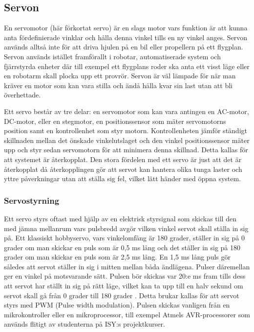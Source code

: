 \documentclass[a4paper,12pt]{article}
\begin{document}
\subsection{Servon}
En servomotor (här förkortat servo) är en slags motor vars funktion är att kunna anta fördefinierade  vinklar och hålla denna vinkel tills en ny vinkel anges. Servon används alltså inte för att driva hjulen på en bil eller propellern på ett flygplan. Servon används istället framförallt i robotar, automatiserade system  och fjärrstyrda enheter där till exempel ett flygplans roder ska anta ett visst läge eller en robotarm skall plocka upp ett provrör. Servon är väl lämpade för när man kräver en motor som kan vara stilla och ändå hålla kvar sin last utan att bli överhettade. 
 
Ett servo består av tre delar: en servomotor som kan vara antingen en AC-motor, DC-motor, eller en stegmotor, en positionssensor som mäter servomotorns position samt en kontrollenhet som styr motorn.  Kontrollenheten jämför ständigt skillnaden mellan det önskade vinkelutslaget och den vinkel positionssensor mäter upp och styr sedan servomotorn för att minimera denna skillnad. Detta kallas för att systemet är återkopplat. Den stora fördelen med ett servo är just att det är återkopplat då återkopplingen gör att servot kan hantera olika tunga laster och yttre påverkningar utan att ställa sig fel, vilket lätt händer med öppna system. 
 
\subsubsection{Servostyrning}
Ett servo styrs oftast med hjälp av en elektrisk styrsignal som skickas till den med jämna mellanrum vars pulsbredd avgör vilken vinkel servot skall ställa in sig på. Ett klassiskt hobbyservo, vars vinkelomfång är 180 grader, ställer in sig på 0 grader om man skickar en puls som är 0,5 ms lång och det ställer in sig på 180 grader om man skickar en puls som är 2,5 ms lång. En 1,5 ms lång puls gör således att servot ställer in sig i mitten mellan båda ändlägena. Pulser däremellan ger en vinkel på motsvarande sätt. Pulsen bör skickas var 20:e ms fram tills dess att servot har ställt in sig på rätt läge, vilket kan ta upp till en halv sekund om servot skall gå från 0 grader till 180 grader \cite{hobbyservo}. Detta brukar kallas för att servot styrs med PWM (Pulse width modulation). Pulsen skickas vanligen från en mikrokontroller eller en mikroprocessor, till exempel Atmels AVR-processorer som används flitigt av studenterna på ISY:s projektkurser.
 
\end{document}
